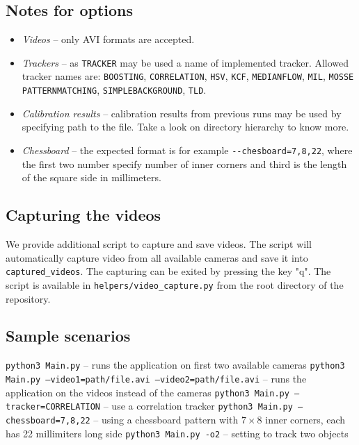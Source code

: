 \subsection{Notes for options}
\begin{itemize}
\item\emph{Videos} -- only AVI formats are accepted.
\item\emph{Trackers} -- as \verb+TRACKER+ may be used a name of implemented tracker.
Allowed tracker names are: 
\verb+BOOSTING+,
\verb+CORRELATION+,
\verb+HSV+,
\verb+KCF+,
\verb+MEDIANFLOW+,
\verb+MIL+,
\verb+MOSSE+
\verb+PATTERNMATCHING+,
\verb+SIMPLEBACKGROUND+,
\verb+TLD+.
\item\emph{Calibration results} -- calibration results from previous runs may be
used by specifying path to the file. Take a look on directory hierarchy to know
more.
\item\emph{Chessboard} -- the expected format is for example
\verb+--chesboard=7,8,22+, where the first two number specify number of inner
corners and third is the length of the square side in millimeters.
\end{itemize}

\subsection{Capturing the videos} 

We provide additional script to capture and save videos. The script will
automatically capture video from all available cameras and save it into
\verb+captured_videos+. The capturing can be exited by pressing the key "q".
The script is available in \texttt{helpers/video\_capture.py} from the root
directory of the repository.  

\subsection{Sample scenarios}

\texttt{python3 Main.py} -- runs the application on first two available cameras
\newline
\texttt{python3 Main.py --video1=path/file.avi --video2=path/file.avi} -- runs the application on the videos instead of the cameras
\newline
\texttt{python3 Main.py --tracker=CORRELATION} -- use a correlation tracker
\newline
\texttt{python3 Main.py --chessboard=7,8,22} -- using a chessboard pattern with $7\times8$ inner corners, each has 22 millimiters long side
\newline
\texttt{python3 Main.py -o2} -- setting to track two objects
